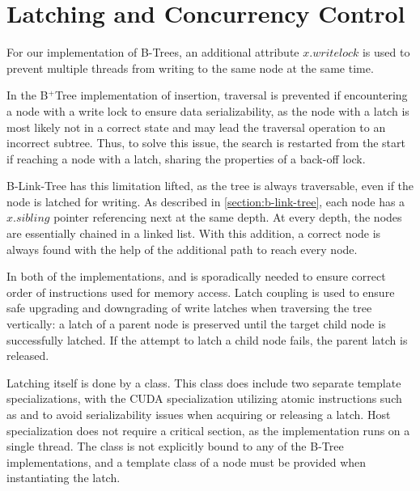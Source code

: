 \section{Latching and Concurrency Control}

For our implementation of B-Trees, an additional attribute $x.writelock$ is used to prevent multiple threads from writing to the same node at the same time.

In the B$^+$Tree implementation of insertion, traversal is prevented if encountering a node with a write lock to ensure data serializability, as the node with a latch is most likely not in a correct state and may lead the traversal operation to an incorrect subtree. Thus, to solve this issue, the search is restarted from the start if reaching a node with a latch, sharing the properties of a back-off lock.

B-Link-Tree has this limitation lifted, as the tree is always traversable, even if the node is latched for writing. As described in \cref{section:b-link-tree}, each node has a $x.sibling$ pointer referencing next at the same depth. At every depth, the nodes are essentially chained in a linked list. With this addition, a correct node is always found with the help of the additional path to reach every node.

In both of the implementations,  and  is sporadically needed to ensure correct order of instructions used for memory access. Latch coupling is used to ensure safe upgrading and downgrading of write latches when traversing the tree vertically: a latch of a parent node is preserved until the target child node is successfully latched. If the attempt to latch a child node fails, the parent latch is released.

Latching itself is done by a  class. This class does include two separate template specializations, with the CUDA specialization utilizing atomic instructions such as  and  to avoid serializability issues when acquiring or releasing a latch. Host specialization does not require a critical section, as the implementation runs on a single thread. The class is not explicitly bound to any of the B-Tree implementations, and a template class of a node must be provided when instantiating the latch.